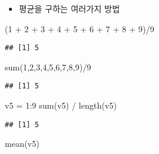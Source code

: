 \documentclass[
]{article}
\newenvironment{Shaded}{\begin{snugshade}}{\end{snugshade}}
\newcommand{\DecValTok}[1]{\textcolor[rgb]{0.00,0.00,0.81}{#1}}
\newcommand{\FunctionTok}[1]{\textcolor[rgb]{0.00,0.00,0.00}{#1}}
\newcommand{\NormalTok}[1]{#1}
\newcommand{\OtherTok}[1]{\textcolor[rgb]{0.56,0.35,0.01}{#1}}
\newcommand{\SpecialCharTok}[1]{\textcolor[rgb]{0.00,0.00,0.00}{#1}}
\providecommand{\tightlist}{%
  \setlength{\itemsep}{0pt}\setlength{\parskip}{0pt}}
\begin{document}
\begin{itemize}
\tightlist
\item
  평균을 구하는 여러가지 방법
\end{itemize}

\begin{Shaded}
\begin{Highlighting}[]
\NormalTok{(}\DecValTok{1} \SpecialCharTok{+} \DecValTok{2} \SpecialCharTok{+} \DecValTok{3} \SpecialCharTok{+} \DecValTok{4} \SpecialCharTok{+} \DecValTok{5} \SpecialCharTok{+} \DecValTok{6} \SpecialCharTok{+} \DecValTok{7} \SpecialCharTok{+} \DecValTok{8} \SpecialCharTok{+} \DecValTok{9}\NormalTok{)}\SpecialCharTok{/}\DecValTok{9}
\end{Highlighting}
\end{Shaded}

\begin{verbatim}
## [1] 5
\end{verbatim}

\begin{Shaded}
\begin{Highlighting}[]
\FunctionTok{sum}\NormalTok{(}\DecValTok{1}\NormalTok{,}\DecValTok{2}\NormalTok{,}\DecValTok{3}\NormalTok{,}\DecValTok{4}\NormalTok{,}\DecValTok{5}\NormalTok{,}\DecValTok{6}\NormalTok{,}\DecValTok{7}\NormalTok{,}\DecValTok{8}\NormalTok{,}\DecValTok{9}\NormalTok{)}\SpecialCharTok{/}\DecValTok{9}
\end{Highlighting}
\end{Shaded}

\begin{verbatim}
## [1] 5
\end{verbatim}

\begin{Shaded}
\begin{Highlighting}[]
\NormalTok{v5 }\OtherTok{=} \DecValTok{1}\SpecialCharTok{:}\DecValTok{9}
\FunctionTok{sum}\NormalTok{(v5) }\SpecialCharTok{/} \FunctionTok{length}\NormalTok{(v5)}
\end{Highlighting}
\end{Shaded}

\begin{verbatim}
## [1] 5
\end{verbatim}

\begin{Shaded}
\begin{Highlighting}[]
\FunctionTok{mean}\NormalTok{(v5)}
\end{Highlighting}
\end{Shaded}
\end{document}
